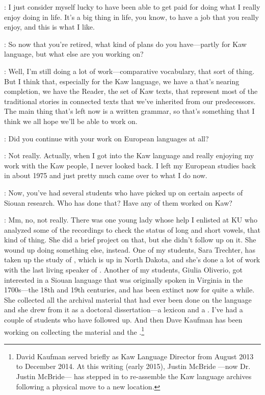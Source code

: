 \documentclass[output=paper]{LSP/langsci}
\begin{document}
: I just consider myself lucky to have been able to get paid for doing what I really enjoy doing in life. It's a big thing in life, you know, to have a job that you really enjoy, and this is what I like.

: So now that you're retired, what kind of plans do you have---partly for Kaw language, but what else are you working on?

: Well, I'm still doing a lot of work---comparative vocabulary, that sort of thing. But I think that, especially for the Kaw language, we have a  that's nearing completion, we have the Reader, the set of Kaw texts, that represent most of the traditional stories in connected texts that we've inherited from our predecessors. The main thing that's left now is a written grammar, so that's something that I think we all hope we'll be able to work on.

: Did you continue with your work on European languages at all?

: Not really. Actually, when I got into the Kaw language and really enjoying my work with the Kaw people, I never looked back. I left my European studies back in about 1975 and just pretty much came over to what I do now.

: Now, you've had several students who have picked up on certain aspects of Siouan research. Who has done that? Have any of them worked on Kaw?

: Mm, no, not really. There was one young lady whose help I enlisted at KU who analyzed some of the recordings to check the status of long and short vowels, that kind of thing. She did a brief project on that, but she didn't follow up on it. She wound up doing something else, instead. One of my students, Sara Trechter, has taken up the study of , which is up in North Dakota, and she's done a lot of work with the last living speaker of . Another of my students, Giulia Oliverio, got interested in a Siouan language that was originally spoken in Virginia in the 1700s---the 18th and 19th centuries, and has been extinct now for quite a while. She collected all the archival material that had ever been done on the  language and she drew from it as a doctoral dissertation---a lexicon and a . I've had a couple of students who have followed up. And then Dave Kaufman has been working on collecting the  material and the  .\footnote{David Kaufman served briefly as Kaw Language Director from August 2013 to December 2014. At this writing (early 2015), Justin McBride ---now Dr. Justin McBride--- has stepped in to re-assemble the Kaw language archives following a physical move to a new location.}
\end{document}
